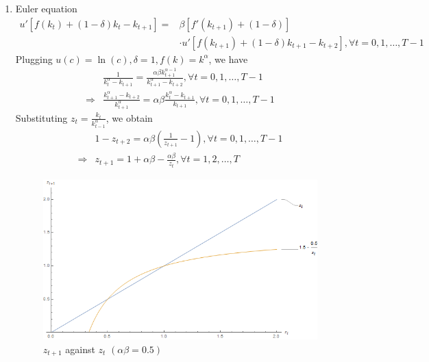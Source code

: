 \documentclass{article}
\begin{document}
\begin{enumerate}
\begin{enumerate}
\begin{proof}
\begin{align*}
\begin{aligned}
                \end{aligned}
            \right.
        \end{align*}
        \end{proof}
        \item Euler equation
        \begin{equation*}
            \begin{split}
                {u}'[f(k_t)+(1-\delta)k_t-k_{t+1}]=&\beta[{f}'(k_{t+1})+(1-\delta)]\\
                &\cdot{u}'[f(k_{t+1})+(1-\delta)k_{t+1}-k_{t+2}],\forall t=0,1,\dots,T-1
            \end{split}
        \end{equation*}
        Plugging ${u}(c)=\ln(c),\delta=1,{f}(k)=k^\alpha$, we have
        \begin{align*}
            &\frac{1}{k_t^\alpha-k_{t+1}}=\frac{\alpha\beta k_{t+1}^{\alpha-1}}{k_{t+1}^\alpha-k_{t+2}},\forall t=0,1,\dots,T-1\\
            \Rightarrow&\frac{k_{t+1}^\alpha-k_{t+2}}{k_{t+1}^{\alpha}}=\alpha\beta\frac{k_t^\alpha-k_{t+1}}{k_{t+1}},\forall t=0,1,\dots,T-1
        \end{align*}
        Substituting $z_t=\frac{k_t}{k_{t-1}^\alpha}$, we obtain
        \begin{align*}
            &1-z_{t+2}=\alpha\beta\left(\frac{1}{z_{t+1}}-1\right),\forall t=0,1,\dots,T-1\\
            \Rightarrow&z_{t+1}=1+\alpha\beta-\frac{\alpha\beta}{z_t},\forall t=1,2,\dots,T
        \end{align*}
        \begin{figure}[h!]
            \includegraphics[width=\linewidth]{3_2c.png}
            \caption{$z_{t+1}$ against $z_t$ $(\alpha\beta=0.5)$}

\end{figure}
\end{enumerate}
\end{enumerate}
\end{document}
